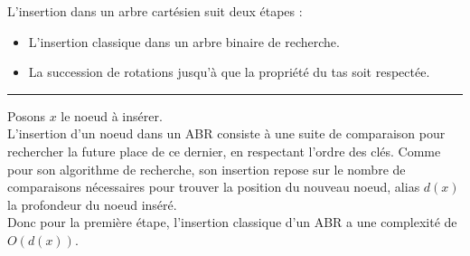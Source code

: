 \documentclass[a4paper,12pt]{report}
\begin{document}
\begin{tcolorbox}[colback=gray!10, colframe=blue!30, coltitle=black, title=Réponse à la 3.b - 1/2]

    L'insertion dans un arbre cartésien suit deux étapes :\\[-0.4cm]
    \begin{itemize}
        \item L'insertion classique dans un arbre binaire de recherche.
        \item La succession de rotations jusqu'à que la propriété du tas soit respectée.
    \end{itemize}

    \vspace{0.5cm}
    \hrule
    \vspace{0.5cm}

    Posons \( x \) le noeud à insérer.\\

    L'insertion d'un noeud dans un ABR consiste à une suite de comparaison pour rechercher la future place de ce dernier, en respectant l'ordre des clés. Comme pour son algorithme de recherche, son insertion repose sur le nombre de comparaisons nécessaires pour trouver la position du nouveau noeud, alias \( d(x) \) la profondeur du noeud inséré.\\

    Donc pour la première étape, l'insertion classique d'un ABR a une complexité de \( O(d(x)) \).

\end{tcolorbox}
\end{document}
